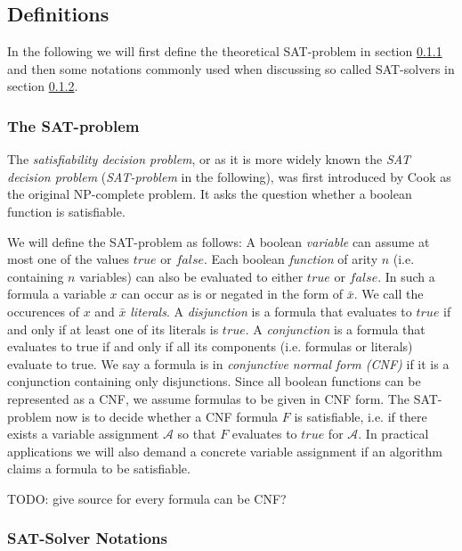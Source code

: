 \documentclass[12pt,a4paper,twoside]{scrartcl}
\numberwithin{equation}{section}
\begin{document}
\subsection{Definitions}
\label{sec:definitions}

In the following we will first define the theoretical SAT-problem in section \ref{sec:SATproblem} and then some notations commonly used when discussing so called SAT-solvers in section \ref{sec:solverNotation}.

\subsubsection{The SAT-problem}
\label{sec:SATproblem}

The \textit{satisfiability decision problem}, or as it is more widely known the \textit{SAT decision problem} (\textit{SAT-problem} in the following), was first introduced by Cook \cite{satProblem} as the original NP-complete problem. It asks the question whether a boolean function is satisfiable.

We will define the SAT-problem as follows:
A boolean \textit{variable} can assume at most one of the values $true$ or $false$. Each boolean \textit{function} of arity $n$ (i.e. containing $n$ variables) can also be evaluated to either $true$ or $false$. In such a formula a variable $x$ can occur as is or negated in the form of $\bar{x}$. We call the occurences of $x$ and $\bar{x}$ \textit{literals}. A \textit{disjunction} is a formula that evaluates to $true$ if and only if at least one of its literals is $true$. A \textit{conjunction} is a formula that evaluates to true if and only if all its components (i.e. formulas or literals) evaluate to true. We say a formula is in \textit{conjunctive normal form (CNF)} if it is a conjunction containing only disjunctions. Since all boolean functions can be represented as a CNF, we assume formulas to be given in CNF form. 
The SAT-problem now is to decide whether a CNF formula $F$ is satisfiable, i.e. if there exists a variable assignment $\mathcal{A}$ so that $F$ evaluates to $true$ for $\mathcal{A}$. In practical applications we will also demand a concrete variable assignment if an algorithm claims a formula to be satisfiable.


TODO: give source for every formula can be CNF?

\subsubsection{SAT-Solver Notations}
\label{sec:solverNotation}
\end{document}

